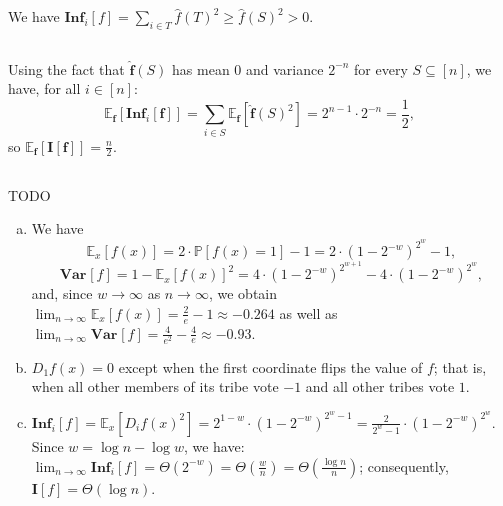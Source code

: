 \documentclass[12pt]{article}
\newcommand{\E}[2]{\mathbb E_{#1}\left[#2\right]}
\renewcommand{\P}{\mathbb P}
\newcommand{\Inf}{\mathbf{Inf}}
\newcommand{\I}{\mathbf{I}}
\newcommand{\Var}[2]{\mathbf{Var}_{#1}\left[#2\right]}
\newcommand{\eqn}[1]{\begin{equation*}#1\end{equation*}}
\newcommand{\hf}{\widehat{f}}
\newcommand{\TODO}{{\color{red}TODO}}
\begin{document}
\subsection{}

\subsection{}
We have $\Inf_i[f] = \sum_{i \in T} \hf(T)^2 \geq \hf(S)^2 > 0$.

\subsection{}
Using the fact that $\mathbf{\hf}(S)$ has mean 0 and variance $2^{-n}$ for every $S \subseteq [n]$, we have, for all $i \in [n]$:
\eqn{\E{\mathbf{f}}{\Inf_i[\mathbf{f}]} = \sum_{i \in S} \E{\mathbf{f}}{\mathbf{\hf}(S)^2} = 2^{n-1} \cdot 2^{-n} = \frac1{2},}
so $\E{\mathbf{f}}{\I[\mathbf{f}]} = \frac{n}{2}$.

\subsection{}
\TODO
\begin{enumerate}[(a)]
    \item We have
          \eqn{\E{x}{f(x)} = 2 \cdot \P[f(x) = 1] - 1 = 2 \cdot (1 - 2^{-w})^{2^w} - 1,}%
          \eqn{\Var{}{f} = 1 - \E{x}{f(x)}^2 = 4 \cdot (1 - 2^{-w})^{2^{w + 1}} - 4 \cdot (1 - 2^{-w})^{2^w},}
          and, since $w \to \infty$ as $n \to \infty$, we obtain $\lim_{n \to \infty} \E{x}{f(x)} = \frac{2}{e} - 1 \approx -0.264$ as well as $\lim_{n \to \infty} \Var{}{f} = \frac{4}{e^2} - \frac{4}{e} \approx -0.93$.
          
    \item $D_1 f(x) = 0$ except when the first coordinate flips the value of $f$; that is, when all other members of its tribe vote $-1$ and all other tribes vote $1$.
    
    \item $\Inf_i[f] = \E{x}{D_i f(x)^2} = 2^{1-w} \cdot (1 - 2^{-w})^{2^w - 1} = \frac{2}{2^w - 1} \cdot (1 - 2^{-w})^{2^w}$. Since $w = \log n - \log w$, we have: $\lim_{n \to \infty} \Inf_i[f] = \Theta\left(2^{-w}\right) = \Theta\left(\frac{w}{n}\right) = \Theta\left(\frac{\log n}{n}\right)$; consequently, $\I[f] = \Theta(\log n)$.
\end{enumerate}

\subsection{}
\end{document}
